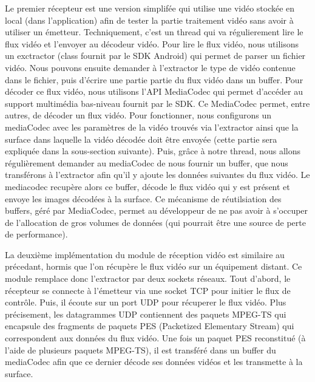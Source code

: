 \documentclass[11pt,a4paper]{article}
\begin{document}
\bigbreak
Le premier récepteur est une version simplifée qui utilise une vidéo stockée en local (dans l'application) afin de tester la partie traitement vidéo sans avoir à utiliser un émetteur.
Techniquement, c'est un thread qui va régulierement lire le flux vidéo et l'envoyer au décodeur vidéo. 
Pour lire le flux vidéo, nous utilisons un exctractor (class fournit par le SDK Android) qui permet de parser un fichier vidéo. Nous pouvons ensuite demander à l'extractor le type de vidéo contenue dans le fichier, puis d'écrire une partie partie du flux vidéo dans un buffer.
Pour décoder ce flux vidéo, nous utilisons l'API MediaCodec qui permet d'accéder au support multimédia bas-niveau fournit par le SDK. Ce MediaCodec permet, entre autres, de décoder un flux vidéo.
Pour fonctionner, nous configurons un mediaCodec avec les paramètres de la vidéo trouvés via l'extractor ainsi que la surface dans laquelle la vidéo décodée doit être envoyée (cette partie sera expliquée dans la sous-section suivante).
Puis, grâce à notre thread, nous allons régulièrement demander au mediaCodec de nous fournir un buffer, que nous transférons à l'extractor afin qu'il y ajoute les données suivantes du flux vidéo.
Le mediacodec recupère alors ce buffer, décode le flux vidéo qui y est présent et envoye les images décodées à la surface.
Ce mécanisme de réutilsiation des buffers, géré par MediaCodec, permet au développeur de ne pas avoir à s'occuper de l'allocation de gros volumes de données (qui pourrait être une source de perte de performance). 

\bigbreak
La deuxième implémentation du module de réception vidéo est similaire au précedant, hormis que l'on récupère le flux vidéo sur un équipement distant.
Ce module remplace donc l'extractor par deux sockets réseaux.
Tout d'abord, le récepteur se connecte à l'émetteur via une socket TCP pour initier le flux de contrôle.
Puis, il écoute sur un port UDP pour récuperer le flux vidéo.
Plus précisement, les datagrammes UDP contiennent des paquets MPEG-TS qui encapsule des fragments de paquets PES (Packetized Elementary Stream) qui correspondent aux données du flux vidéo.
Une fois un paquet PES reconstitué (à l'aide de plusieurs paquets MPEG-TS), il est transféré dans un buffer du mediaCodec afin que ce dernier décode ses données vidéos et les transmette à la surface.
\end{document}

